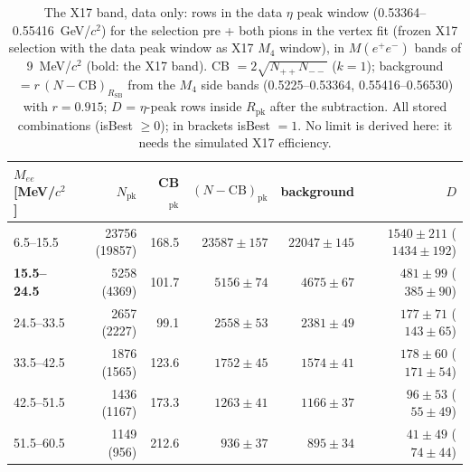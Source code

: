\begin{table}[H]
\centering\small
\setlength{\tabcolsep}{4pt}
\caption{The X17 band, data only: rows in the data $\eta$ peak window (0.53364--0.55416~GeV/$c^2$) for the selection pre + both pions in the vertex fit (frozen X17 selection with the data peak window as X17 $M_4$ window), in $M(e^+e^-)$ bands of 9~MeV/$c^2$ (bold: the X17 band). CB $=2\sqrt{N_{++}N_{--}}$ ($k=1$); background $=r\,(N-\mathrm{CB})_{R_\mathrm{SB}}$ from the $M_4$ side bands (0.5225--0.53364, 0.55416--0.56530) with $r=0.915$; $D$ = $\eta$-peak rows inside $R_\mathrm{pk}$ after the subtraction. All stored combinations (isBest $\geq0$); in brackets isBest $=1$. No limit is derived here: it needs the simulated X17 efficiency.}
\label{tab:res_x17}
\begin{tabular}{lrrrrr}
\toprule
$M_{ee}$ [MeV/$c^2$] & $N_\mathrm{pk}$ & CB$_\mathrm{pk}$ & $(N-\mathrm{CB})_\mathrm{pk}$ & background & $D$ \\
\midrule
6.5--15.5 & 23756 (19857) & 168.5 & $23587\pm157$ & $22047\pm145$ & $1540\pm211$ ($1434\pm192$) \\
\textbf{15.5--24.5} & 5258 (4369) & 101.7 & $5156\pm74$ & $4675\pm67$ & $481\pm99$ ($385\pm90$) \\
24.5--33.5 & 2657 (2227) & 99.1 & $2558\pm53$ & $2381\pm49$ & $177\pm71$ ($143\pm65$) \\
33.5--42.5 & 1876 (1565) & 123.6 & $1752\pm45$ & $1574\pm41$ & $178\pm60$ ($171\pm54$) \\
42.5--51.5 & 1436 (1167) & 173.3 & $1263\pm41$ & $1166\pm37$ & $96\pm53$ ($55\pm49$) \\
51.5--60.5 & 1149 (956) & 212.6 & $936\pm37$ & $895\pm34$ & $41\pm49$ ($74\pm44$) \\
\bottomrule
\end{tabular}
\end{table}
